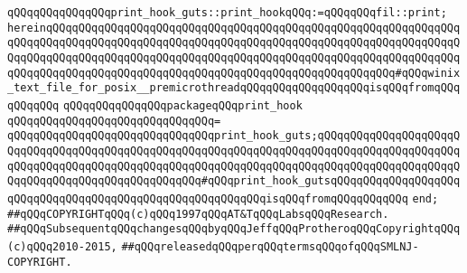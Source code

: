 \verb|qQQqqQQqqQQqqQQqprint_hook_guts::print_hookqQQq:=qQQqqQQqfil::print;|\newline
\verb|hereinqQQqqQQqqQQqqQQqqQQqqQQqqQQqqQQqqQQqqQQqqQQqqQQqqQQqqQQqqQQqqQQqqQQqqQQqqQQqqQQqqQQqqQQqqQQqqQQqqQQqqQQqqQQqqQQqqQQqqQQqqQQqqQQqqQQqqQQqqQQqqQQqqQQqqQQqqQQqqQQqqQQqqQQqqQQqqQQqqQQqqQQqqQQqqQQqqQQqqQQqqQQqqQQqqQQqqQQqqQQqqQQqqQQqqQQqqQQqqQQqqQQqqQQqqQQqqQQqqQQqqQQq#qQQqwinix_text_file_for_posix__premicrothreadqQQqqQQqqQQqqQQqqQQqisqQQqfromqQQqqQQqqQQq|\newline
\verb|qQQqqQQqqQQqqQQqpackageqQQqprint_hook|\newline
\verb|qQQqqQQqqQQqqQQqqQQqqQQqqQQqqQQq=|\newline
\verb|qQQqqQQqqQQqqQQqqQQqqQQqqQQqqQQqprint_hook_guts;qQQqqQQqqQQqqQQqqQQqqQQqqQQqqQQqqQQqqQQqqQQqqQQqqQQqqQQqqQQqqQQqqQQqqQQqqQQqqQQqqQQqqQQqqQQqqQQqqQQqqQQqqQQqqQQqqQQqqQQqqQQqqQQqqQQqqQQqqQQqqQQqqQQqqQQqqQQqqQQqqQQqqQQqqQQqqQQqqQQqqQQqqQQqqQQq#qQQqprint_hook_gutsqQQqqQQqqQQqqQQqqQQqqQQqqQQqqQQqqQQqqQQqqQQqqQQqqQQqqQQqqQQqisqQQqfromqQQqqQQqqQQq|\newline
\verb|end;|\newline
\newline
\newline
\newline
\verb|##qQQqCOPYRIGHTqQQq(c)qQQq1997qQQqAT&TqQQqLabsqQQqResearch.|\newline
\verb|##qQQqSubsequentqQQqchangesqQQqbyqQQqJeffqQQqProtheroqQQqCopyrightqQQq(c)qQQq2010-2015,|\newline
\verb|##qQQqreleasedqQQqperqQQqtermsqQQqofqQQqSMLNJ-COPYRIGHT.|\newline

